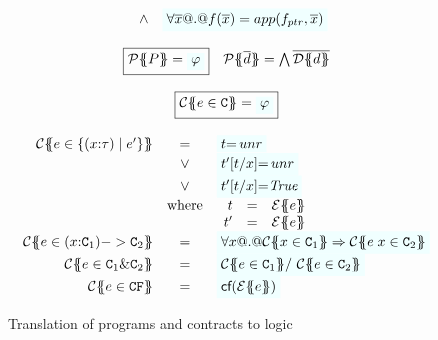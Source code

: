 \begin{figure}
\[\begin{array}{c}
\begin{array}{rcl}
    & \land & \formula{\forall \ol{x} @.@ f(\ol{x}) = app(f_{ptr},\xs)} \\
\end{array}
\\ \\
\ruleform{\ptrans{\Sigma}{P} = \formula{\phi} } \quad
\ptrans{\Sigma}{\ol{d}} = \bigwedge \ol{\dtrans{\Sigma}{d}}
\\ \\
\ruleform{\ctrans{\Sigma}{\Gamma}{e \in \Ct} = \formula{\phi}} \\ \\ 
\begin{array}{rcl}
\ctrans{\Sigma}{\Gamma}{e \in \{(x{:}\tau) \mid e' \}} 
  & = & \formula{t{=}\unr} \\ 
  & \lor & \formula{t'[t/x]{=}\unr} \\
  & \lor & \formula{t'[t/x]{=}\True} \\
  & \mbox{where} & 
    \begin{array}[t]{rcl}
      t  & = & \etrans{\Sigma}{\Gamma}{e} \\
      t' & = & \etrans{\Sigma}{\Gamma}{e} 
    \end{array}
\\
\ctrans{\Sigma}{\Gamma}{e \in (x{:}\Ct_1) -> \Ct_2} 
  & = & \formula{\forall x @.@ \ctrans{\Sigma}{\Gamma,x}{x \in \Ct_1} 
                          \Rightarrow \ctrans{\Sigma}{\Gamma,x}{e\;x \in \Ct_2}}
\\
\ctrans{\Sigma}{\Gamma}{e \in \Ct_1 \& \Ct_2} 
   & = & \formula{ \ctrans{\Sigma}{\Gamma}{e \in \Ct_1} /\ \ctrans{\Sigma}{\Gamma}{e \in \Ct_2}}
\\
\ctrans{\Sigma}{\Gamma}{e \in \CF} & = & \formula{\lcf{\etrans{\Sigma}{\Gamma}{e}}}
\end{array}
\end{array}\]
\caption{Translation of programs and contracts to logic}\label{fig:etrans}
\end{figure}
